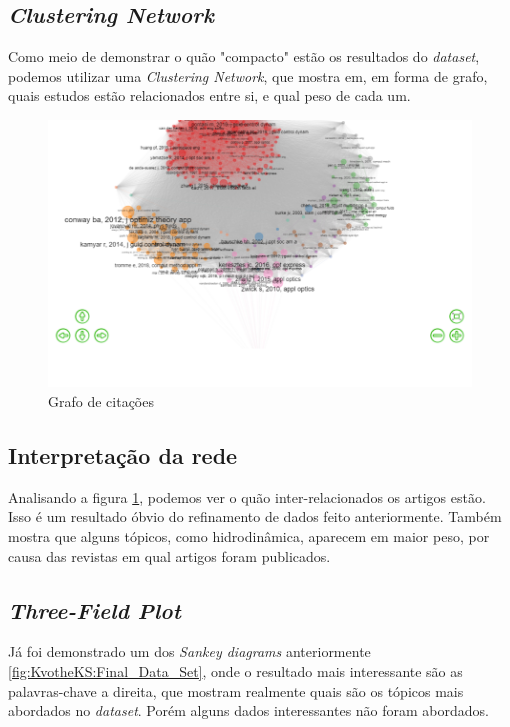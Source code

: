 \subsection{\emph{Clustering Network}}
    Como meio de demonstrar o quão "compacto" estão os resultados do \emph{dataset}, podemos utilizar uma \emph{Clustering Network}, que mostra em, em forma de grafo, quais estudos estão relacionados entre si, e qual peso de cada um.  
\begin{figure}[H]
    \centering
    \includegraphics[width=1\textwidth]{experiments/KvotheKS/PesqBibliogr/AlgoritmosSimulacaoOptica-Dinamica/WoS-20220202/Dataset/Cluster_network.png}
    \caption{Grafo de citações}
    \label{fig:KvotheKS:Cluster_}
\end{figure}
\subsection{Interpretação da rede}
    Analisando a figura \ref{fig:KvotheKS:Cluster_}, podemos ver o quão inter-relacionados os artigos estão. Isso é um resultado óbvio do refinamento de dados feito anteriormente. Também mostra que alguns tópicos, como hidrodinâmica, aparecem em maior peso, por causa das revistas em qual artigos foram publicados. 
\subsection{\emph{Three-Field Plot}}
    Já foi demonstrado um dos \emph{Sankey diagrams} anteriormente \ref{fig:KvotheKS:Final_Data_Set}, onde o resultado mais interessante são as palavras-chave a direita, que mostram realmente quais são os tópicos mais abordados no \emph{dataset}. Porém alguns dados interessantes não foram abordados.
    
